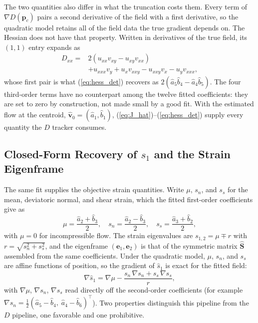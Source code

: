 \documentclass[lettersize,journal]{IEEEtran}
\begin{document}
The two quantities also differ in what the truncation costs them. Every
term of $\nabla D(\mathbf{p}_c)$ pairs a second derivative of the field
with a first derivative, so the quadratic model retains all of the field
data the true gradient depends on. The Hessian does not have that
property. Written in derivatives of the true field, its $(1,1)$ entry
expands as
\begin{equation}
\begin{split}
    D_{xx} = {}&2(u_{xx} v_{xy} - u_{xy} v_{xx}) \\
        &+ u_{xxx} v_y + u_x v_{xxy}
        - u_{xxy} v_x - u_y v_{xxx},
\end{split}
    \label{eq:Dxx_true}
\end{equation}
whose first pair is what (\ref{eq:hess_det}) recovers as $2(\hat{a}_5
\hat{b}_4 - \hat{a}_4 \hat{b}_5)$. The four third-order terms have no
counterpart among the twelve fitted coefficients: they are set to zero by
construction, not made small by a good fit. With the
estimated flow at the centroid, $\hat{\mathbf{v}}_0 = (\hat{a}_1,
\hat{b}_1)$, (\ref{eq:J_hat})--(\ref{eq:hess_det}) supply every quantity
the $D$ tracker consumes.

\subsection{Closed-Form Recovery of $s_1$ and the Strain Eigenframe}
\label{sec:s1_estimation}

The same fit supplies the objective strain quantities. Write $\mu$,
$s_n$, and $s_s$ for the
mean, deviatoric normal, and shear strain, which the fitted first-order
coefficients give as
\begin{equation}
    \mu = \frac{\hat{a}_2 + \hat{b}_3}{2}, \quad
    s_n = \frac{\hat{a}_2 - \hat{b}_3}{2}, \quad
    s_s = \frac{\hat{a}_3 + \hat{b}_2}{2},
    \label{eq:strain_parts}
\end{equation}
with $\mu = 0$ for incompressible flow. The strain eigenvalues are
$s_{1,2} = \mu \mp r$ with $r = \sqrt{s_n^2 + s_s^2}$, and the
eigenframe $(\mathbf{e}_1, \mathbf{e}_2)$ is that of the symmetric
matrix $\hat{\mathbf{S}}$ assembled from the same coefficients. Under
the quadratic model, $\mu$, $s_n$, and $s_s$ are affine functions of
position, so the gradient of $\hat{s}_1$ is exact for the fitted field:
\begin{equation}
    \nabla \hat{s}_1 = \nabla\mu
    - \frac{s_n\,\nabla s_n + s_s\,\nabla s_s}{r},
    \label{eq:grad_s1}
\end{equation}
with $\nabla\mu$, $\nabla s_n$, $\nabla s_s$ read directly off the
second-order coefficients (for example $\nabla s_n = \tfrac{1}{2}
(\hat{a}_5 - \hat{b}_4,\; \hat{a}_4 - \hat{b}_6)^\top$). Two properties
distinguish this pipeline from the $D$ pipeline, one favorable and one
prohibitive.
\end{document}
